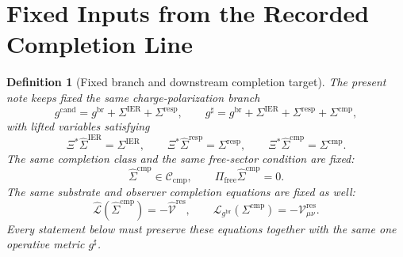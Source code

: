 \documentclass[11pt]{article}
\newcommand{\ObserverMap}{\Xi}
\newcommand{\ObserverMetric}{g^{\mathrm{br}}}
\newcommand{\CandidateMetric}{g^{\mathrm{cand}}}
\newcommand{\CompletedMetric}{g^{\sharp}}
\newcommand{\BaseShift}{\Sigma^{\mathrm{IER}}}
\newcommand{\ResponseShift}{\Sigma^{\mathrm{resp}}}
\newcommand{\CompShift}{\Sigma^{\mathrm{cmp}}}
\newcommand{\BaseLift}{\widehat\Sigma^{\mathrm{IER}}}
\newcommand{\ResponseLift}{\widehat\Sigma^{\mathrm{resp}}}
\newcommand{\CompLift}{\widehat\Sigma^{\mathrm{cmp}}}
\newcommand{\ResidualCore}{\mathcal V_{\mu\nu}^{\mathrm{res}}}
\newcommand{\ResidualLift}{\widehat{\mathcal V}^{\mathrm{res}}}
\newcommand{\SubReducedEin}{\widehat{\mathcal L}}
\newcommand{\FreeProj}{\Pi_{\mathrm{free}}}
\newcommand{\ReducedEin}{\mathcal L_{\ObserverMetric}}
\newcommand{\CompClass}{\mathscr C_{\mathrm{cmp}}}
\newtheorem{definition}{Definition}
\begin{document}
\section{Fixed Inputs from the Recorded Completion Line}

\begin{definition}[Fixed branch and downstream completion target]
\label{def:fixed_branch}
The present note keeps fixed the same charge-polarization branch
\begin{equation}
\CandidateMetric
=
\ObserverMetric+\BaseShift+\ResponseShift,
\qquad
\CompletedMetric
=
\ObserverMetric+\BaseShift+\ResponseShift+\CompShift,
\label{eq:fixed_metrics}
\end{equation}
with lifted variables satisfying
\begin{equation}
\ObserverMap^*\BaseLift=\BaseShift,
\qquad
\ObserverMap^*\ResponseLift=\ResponseShift,
\qquad
\ObserverMap^*\CompLift=\CompShift.
\label{eq:fixed_lifts}
\end{equation}
The same completion class and the same free-sector condition are fixed:
\begin{equation}
\CompLift\in\CompClass,
\qquad
\FreeProj\CompLift=0.
\label{eq:fixed_free}
\end{equation}
The same substrate and observer completion equations are fixed as well:
\begin{equation}
\SubReducedEin(\CompLift)=-\ResidualLift,
\qquad
\ReducedEin(\CompShift)=-\ResidualCore.
\label{eq:fixed_solves}
\end{equation}
Every statement below must preserve these equations together with the same one operative metric \(\CompletedMetric\).
\end{definition}
\end{document}
